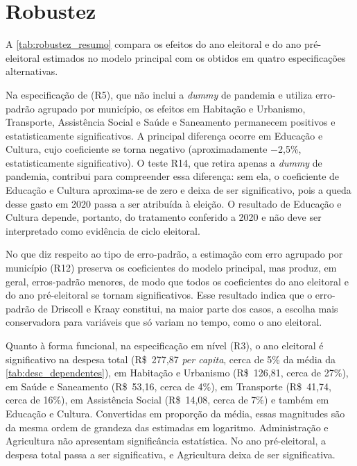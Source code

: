 

\section{Robustez}\label{sec:res_robustez}

A \autoref{tab:robustez_resumo} compara os efeitos do ano eleitoral e do ano pré-eleitoral estimados no modelo principal com os obtidos em quatro especificações alternativas.

Na especificação de \textcite{sakurai2009} (R5), que não inclui a \textit{dummy} de pandemia e utiliza erro-padrão agrupado por município, os efeitos em Habitação e Urbanismo, Transporte, Assistência Social e Saúde e Saneamento permanecem positivos e estatisticamente significativos. A principal diferença ocorre em Educação e Cultura, cujo coeficiente se torna negativo (aproximadamente $-$2,5\%, estatisticamente significativo). O teste R14, que retira apenas a \textit{dummy} de pandemia, contribui para compreender essa diferença: sem ela, o coeficiente de Educação e Cultura aproxima-se de zero e deixa de ser significativo, pois a queda desse gasto em 2020 passa a ser atribuída à eleição. O resultado de Educação e Cultura depende, portanto, do tratamento conferido a 2020 e não deve ser interpretado como evidência de ciclo eleitoral.

No que diz respeito ao tipo de erro-padrão, a estimação com erro agrupado por município (R12) preserva os coeficientes do modelo principal, mas produz, em geral, erros-padrão menores, de modo que todos os coeficientes do ano eleitoral e do ano pré-eleitoral se tornam significativos. Esse resultado indica que o erro-padrão de Driscoll e Kraay constitui, na maior parte dos casos, a escolha mais conservadora para variáveis que só variam no tempo, como o ano eleitoral.

Quanto à forma funcional, na especificação em nível (R3), o ano eleitoral é significativo na despesa total (R\$~277,87 \textit{per capita}, cerca de 5\% da média da \autoref{tab:desc_dependentes}), em Habitação e Urbanismo (R\$~126,81, cerca de 27\%), em Saúde e Saneamento (R\$~53,16, cerca de 4\%), em Transporte (R\$~41,74, cerca de 16\%), em Assistência Social (R\$~14,08, cerca de 7\%) e também em Educação e Cultura. Convertidas em proporção da média, essas magnitudes são da mesma ordem de grandeza das estimadas em logaritmo. Administração e Agricultura não apresentam significância estatística. No ano pré-eleitoral, a despesa total passa a ser significativa, e Agricultura deixa de ser significativa.

